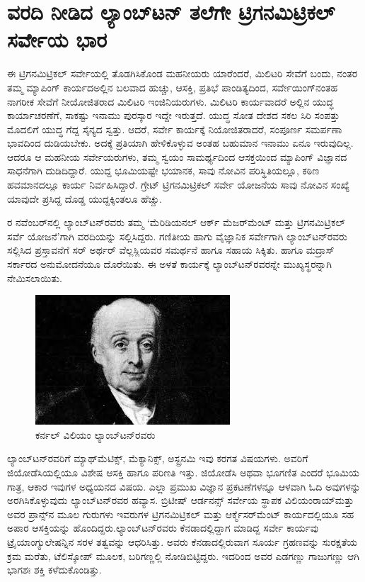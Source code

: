 
\chapter{ವರದಿ ನೀಡಿದ ಲ್ಯಾಂಬ್​ಟನ್​ ತಲೆಗೇ ಟ್ರಿಗನಮಿಟ್ರಿಕಲ್​ ಸರ್ವೇಯ ಭಾರ}

ಈ ಟ್ರಿಗನಮಿಟ್ರಿಕಲ್​ ಸರ್ವೇಯಲ್ಲಿ ತೊಡಗಿಸಿಕೊಂಡ ಮಹನೀಯರು ಯಾರೆಂದರೆ, ಮಿಲಿಟರಿ ಸೇವೆಗೆ ಬಂದು, ನಂತರ ತಮ್ಮ ಮ್ಯಾಪಿಂಗ್​ ಕಾರ್ಯದಅಲ್ಲಿನ ಬಲವಾದ ಹುಚ್ಚು, ಆಸಕ್ತಿ, ಪ್ರತಿಭೆ ಪಾಂಡಿತ್ಯದಿಂದ, ಸರ್ವೇಯಿಂಗ್​ನಂತಹ ನಾಗರೀಕ ಸೇವೆಗೆ ನೀಯೋಜಿತರಾದ ಮಿಲಿಟರಿ ಇಂಜಿನಿಯರುಗಳು. ಮಿಲಿಟರಿ ಕಾರ್ಯವಾದರೆ ಅಲ್ಲಿನ ಯುದ್ಧ ಕಾರ್ಯಾಚರಣೆಗೆ, ಸಾಕಷ್ಟು ಇನಾಮು ಪುರಸ್ಕಾರ ಇದ್ದೇ ಇರುತ್ತದೆ. ಯುದ್ಧ ಸೋತ ದೇಶದ ಸಕಲ ಸಿರಿ ಸಂಪತ್ತು ಮೊದಲಿಗೆ ಯುದ್ಧ ಗೆದ್ದ ಸೈನ್ಯದ ಸ್ವತ್ತು. ಆದರೆ, ಸರ್ವೇ ಕಾರ್ಯಕ್ಕೆ ನಿಯೋಜಿತರಾದರೆ, ಸಂಪೂರ್ಣ ಸಮರ್ಪಣಾ ಭಾವದಿಂದ ದುಡಿಯಬೇಕು. ಅದಕ್ಕೆ ಪ್ರತಿಯಾಗಿ ಹೇಳಿಕೊಳ್ಳುವ ಅಂತಹ ಬಹುಮಾನ ಇನಾಮು ಏನೂ ಇರುವುದಿಲ್ಲ. ಆದರೂ ಆ ಮಹನೀಯ ಸರ್ವೇಯರುಗಳು, ತಮ್ಮ ಸ್ವಯಂ ಸಾಮರ್ಥ್ಯದಿಂದ ಆಸಕ್ತಯಿಂದ ಮ್ಯಾಪಿಂಗ್​ ವಿಜ್ಞಾನದ ಸಾಧನೆಗಾಗಿ ದುಡಿದಿದ್ದಾರೆ. ಯುದ್ದ ಭೂಮಿಯಷ್ಟೇ ಭಯಾನಕ, ಸಾವು ನೋವಿನ ಪರಿಸ್ಥಿತಿಯಲ್ಲೂ, ಕಠಿಣ ಹವಮಾನದಲ್ಲೂ ಕಾರ್ಯ ನಿರ್ವಹಿಸಿದ್ದಾರೆ. ಗ್ರೇಟ್​ ಟ್ರಿಗನಮಿಟ್ರಿಕಲ್​ ಸರ್ವೇ ಯೋಜನೆಯ ಸಾವು ನೋವಿನ ಸಂಖ್ಯೆ ಯಾವುದೇ ಪ್ರಸಿದ್ದ ದೊಡ್ಡ ಯುದ್ದಕ್ಕಿಂತಲೂ ಹೆಚ್ಚು.

ರ ನವೆಂಬರ್​ನಲ್ಲಿ ಲ್ಯಾಂಬ್​ಟನ್​ರವರು ತಮ್ಮ ‘ಮೆರಿಡಿಯನಲ್​ ಆರ್ಕ್ ಮೆಜರ್\break ​ಮೆಂಟ್​ ಮತ್ತು ಟ್ರಿಗನಮಿಟ್ರಿಕಲ್​ ಸರ್ವೆ ಯೋಜನೆ’ಗಾಗಿ ವರದಿಯನ್ನು ಸಲ್ಲಿಸಿದ್ದರು. ಗಣಿತೀಯ ಹಾಗು ವೈಜ್ಞಾನಿಕ ಸರ್ವೇಗಾಗಿ ಲ್ಯಾಂಬ್​ಟನ್​ರವರು ಸಲ್ಲಿಸಿದ ಪ್ರಸ್ತಾವನೆಗೆ ಸರ್​ ಅರ್ಥರ್​ ವೆಲ್ಲಸ್ಲಿಯವರ ಸಮರ್ಥನೆ ಹಾಗೂ ಸಹಾಯ ಸಿಕ್ಕಿತು. ಹಾಗೂ ಮದ್ರಾಸ್​ ಸರ್ಕಾರದ ಅನುಮೋದನೆಯೂ ದೊರೆಯಿತು. ಈ ಅಳತೆ ಕಾರ್ಯಕ್ಕೆ ಲ್ಯಾಂಬ್​ಟನ್​ರವರನ್ನೇ ಮುಖ್ಯಸ್ಥರನ್ನಾಗಿ ನೇಮಿಸಲಾಯಿತು.

\begin{figure}[!htbp]
\includegraphics[scale=0.6]{"images/image005.jpg"}
\caption{ಕರ್ನಲ್​ ವಿಲಿಯಂ ಲ್ಯಾಂಬ್​ಟನ್​ರವರು}\label{art4-fig1}
\end{figure}

ಲ್ಯಾಂಬ್​ಟನ್​ರವರಿಗೆ ಮ್ಯಾಥ್​ಮೆಟಿಕ್ಸ್​, ಮೆಕ್ಯಾನಿಕ್ಸ್​, ಅಸ್ಟ್ರನಮಿ ಇವು ಕರಗತ ವಿಷಯಗಳು. ಅವರಿಗೆ ಜಿಯೋಡೆಸಿಯಲ್ಲಿಯೂ ವಿಶೇಷ ಆಸಕ್ತಿ ಹಾಗೂ ಪರಿಣತಿ ಇತ್ತು. ಜಿಯೋಡೆಸಿ ಅಥವಾ ಭೂಗಣಿತ ಎಂದರೆ ಭೂಮಿಯ ಗಾತ್ರ, ಆಕಾರ ಇವುಗಳ ಅಧ್ಯಯನದ ವಿಷಯ. ಎಲ್ಲಾ ಪ್ರಮುಖ ವಿಜ್ಞಾನ ಪ್ರಕಟಣೆಗಳನ್ನೂ ಆಳವಾಗಿ ಓದಿ ಅವುಗಳನ್ನು ಅರಗಿಸಿಕೊಳ್ಳುವುದು ಲ್ಯಾಂಬ್​ಟನ್​ರವರ ಹವ್ಯಾಸ. ಬ್ರಿಟೀಷ್​ ಆರ್ಡನನ್ಸ್​ ಸರ್ವೇಯ ಸ್ಥಾಪಕ ವಿಲಿಯಂರಾಯ್​\break ಮತ್ತು ಅವರ ಪ್ರಾನ್ಸ್​ನ ಮೂಲ ಗುರುಗಳು ಇವರುಗಳ ಟ್ರಿಗನಮಿಟ್ರಿಕಲ್​ ಮತ್ತು ಆರ್ಕ್\break ಮೆಸರ್​ಮೆಂಟ್​ ಕಾರ್ಯದಲ್ಲಿಯೂ ಸಹ ಅಪಾರ ಆಸಕ್ತಿಯನ್ನು ಹೊಂದಿದ್ದರು.\break ಲ್ಯಾಂಬ್​ಟನ್​ರವರು ಕೆನಡಾದಲ್ಲಿದ್ದಾಗ ಮಾಡಿದ್ದ ಸರ್ವೇ ಕಾರ್ಯವು ಟ್ರೈಯಾಂಗ್ಯುಲೇಷನ್ನಿನ ಸರಳ ತತ್ವವನ್ನು ಆಧರಿಸಿತ್ತು. ಅವರು ಕೆನಡಾದಲ್ಲಿರುವಾಗ ಸೂರ್ಯ ಗ್ರಹಣವನ್ನು ಸುರಕ್ಷತೆಯ ಕ್ರಮ ಮರೆತು, ಟೆಲಿಸ್ಕೋಪ್​ ಮೂಲಕ, ಬರಿಗಣ್ಣಲ್ಲಿ ನೋಡಿಬಿಟ್ಟಿದ್ದರು. ಇದರಿಂದ ಅವರ ಎಡಗಣ್ಣು ಗಾಜುಗಣ್ಣು ಆಗಿ ಭಾಗಶಃ ಶಕ್ತಿ ಕಳೆದುಕೊಂಡಿತ್ತು.

